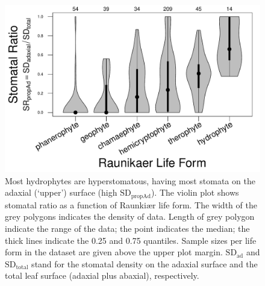 \documentclass[12pt, oneside]{article}
\begin{document}

\begin{figure}[ht]
\centerline{\includegraphics{figures/figureS_violin.pdf}}
\caption{Most hydrophytes are hyperstomatous, having most stomata on the adaxial (`upper') surface (high $\mathrm{SD_{propAd}}$). The violin plot shows stomatal ratio as a function of Raunki\ae r life form. The width of the grey polygons indicates the density of data. Length of grey polygon indicate the range of the data; the point indicates the median; the thick lines indicate the 0.25 and 0.75 quantiles. Sample sizes per life form in the dataset are given above the upper plot margin. $\mathrm{SD_{ad}}$ and $\mathrm{SD_{total}}$ stand for the stomatal density on the adaxial surface and the total leaf surface (adaxial plus abaxial), respectively.}
\label{fig:violin}
\end{figure}
\end{document}
